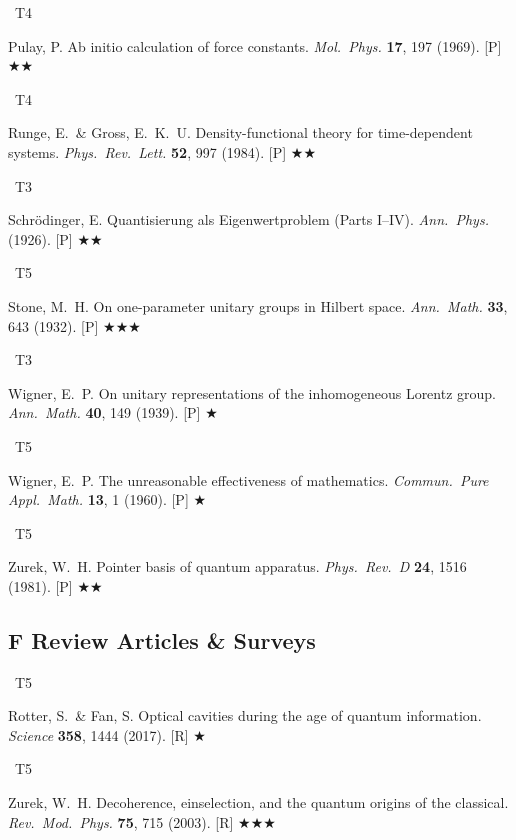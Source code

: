 \documentclass[11pt,a4paper]{article}
\newcommand{\tierbadge}[2]{\colorbox{#1}{\small\bfseries\color{white}\strut\ #2\ }}
\newcommand{\essential}{$\bigstar\bigstar\bigstar$}
\newcommand{\recommended}{$\bigstar\bigstar$}
\newcommand{\useful}{$\bigstar$}
\begin{document}
\begin{tcolorbox}[catbox]
\begin{enumerate}[leftmargin=2.5em,label=\textbf{[E\arabic*]},itemsep=3pt]
  \item \tierbadge{t4orange}{T4} Pulay, P. Ab initio calculation of force constants. \textit{Mol.~Phys.} \textbf{17}, 197 (1969). [P] \recommended
  \item \tierbadge{t4orange}{T4} Runge, E.\ \& Gross, E.~K.~U. Density-functional theory for time-dependent systems. \textit{Phys.~Rev.~Lett.} \textbf{52}, 997 (1984). [P] \recommended
  \item \tierbadge{t3purple}{T3} Schr\"odinger, E. Quantisierung als Eigenwertproblem (Parts I--IV). \textit{Ann.~Phys.} (1926). [P] \recommended
  \item \tierbadge{t5red}{T5} Stone, M.~H. On one-parameter unitary groups in Hilbert space. \textit{Ann.~Math.} \textbf{33}, 643 (1932). [P] \essential
  \item \tierbadge{t3purple}{T3} Wigner, E.~P. On unitary representations of the inhomogeneous Lorentz group. \textit{Ann.~Math.} \textbf{40}, 149 (1939). [P] \useful
  \item \tierbadge{t5red}{T5} Wigner, E.~P. The unreasonable effectiveness of mathematics. \textit{Commun.~Pure Appl.~Math.} \textbf{13}, 1 (1960). [P] \useful
  \item \tierbadge{t5red}{T5} Zurek, W.~H. Pointer basis of quantum apparatus. \textit{Phys.~Rev.~D} \textbf{24}, 1516 (1981). [P] \recommended
\end{enumerate}
\end{tcolorbox}

\subsection*{F \quad Review Articles \& Surveys}
\begin{tcolorbox}[catbox]
\begin{enumerate}[leftmargin=2.5em,label=\textbf{[F\arabic*]},itemsep=3pt]
  \item \tierbadge{t5red}{T5} Rotter, S.\ \& Fan, S. Optical cavities during the age of quantum information. \textit{Science} \textbf{358}, 1444 (2017). [R] \useful
  \item \tierbadge{t5red}{T5} Zurek, W.~H. Decoherence, einselection, and the quantum origins of the classical. \textit{Rev.~Mod.~Phys.} \textbf{75}, 715 (2003). [R] \essential
\end{enumerate}
\end{tcolorbox}
\end{document}
